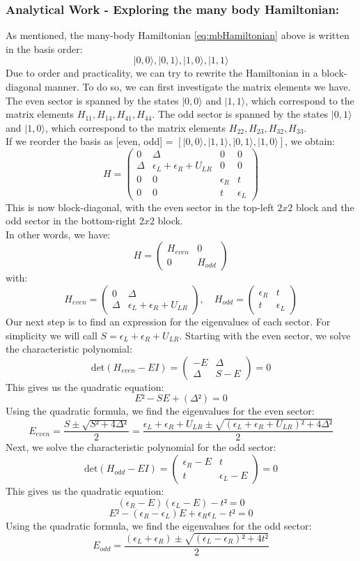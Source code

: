 \documentclass[11pt, letterpaper, titlepage]{article}
\begin{document}
\subsubsection{Analytical Work - Exploring the many body Hamiltonian:} 
As mentioned, the many-body Hamiltonian \ref{eq:mbHamiltonian} above is written in the basis order:
$$ |0,0⟩, |0,1⟩, |1,0⟩, |1,1⟩ $$
Due to order and practicality, we can try to rewrite the Hamiltonian in a block-diagonal manner. To do so, we can first investigate the matrix elements we have. The even sector is spanned by the states $|0,0⟩$ and $|1,1⟩$, which correspond to the matrix elements $H_{11}, H_{14}, H_{41}, H_{44}$. The odd sector is spanned by the states $|0,1⟩$ and $|1,0⟩$, which correspond to the matrix elements $H_{22}, H_{23}, H_{32}, H_{33}$.\\
If we reorder the basis as [even, odd] = $[|0,0⟩, |1,1⟩, |0,1⟩, |1,0⟩]$, we obtain:
$$
H = \begin{pmatrix}
0 & Δ & 0 & 0 \\
Δ & ϵ_L + ϵ_R + U_{LR} & 0 & 0 \\
0 & 0 & ϵ_R & t \\
0 & 0 & t & ϵ_L
\end{pmatrix}
$$
This is now block-diagonal, with the even sector in the top-left $2x2$ block and the odd sector in the bottom-right $2x2$ block.\\
In other words, we have:
$$
H = \begin{pmatrix}
H_{even} & 0 \\
0 & H_{odd}
\end{pmatrix}
$$
with:
$$
H_{even} = \begin{pmatrix}
0 & Δ \\
Δ & ϵ_L + ϵ_R + U_{LR}
\end{pmatrix}, \quad
H_{odd} = \begin{pmatrix}
ϵ_R & t \\
t & ϵ_L
\end{pmatrix}
$$
Our next step is to find an expression for the eigenvalues of each sector. For simplicity we will call $S = ϵ_L + ϵ_R + U_{LR}$. Starting with the even sector, we solve the characteristic polynomial:
$$
\text{det}(H_{even} - EI) = \begin{pmatrix}
    -E & Δ \\
    Δ & S - E
\end{pmatrix} =0
$$
This gives us the quadratic equation:
$$
E² - SE + (Δ²) = 0
$$
Using the quadratic formula, we find the eigenvalues for the even sector:
$$E_{even} = \frac{S ± \sqrt{S² + 4Δ²}}{2} = \frac{ϵ_L + ϵ_R + U_{LR} ± \sqrt{(ϵ_L + ϵ_R + U_{LR})² + 4Δ²}}{2}$$
Next, we solve the characteristic polynomial for the odd sector:
$$
\text{det}(H_{odd} - EI) = \begin{pmatrix}
    ϵ_R - E & t \\
    t & ϵ_L - E
\end{pmatrix} =0
$$
This gives us the quadratic equation:
$$(ϵ_R-E)(ϵ_L - E)  - t² = 0$$
$$E² -(ϵ_R-ϵ_L)E + ϵ_R ϵ_L - t² = 0$$
Using the quadratic formula, we find the eigenvalues for the odd sector:
$$E_{odd} = \frac{(ϵ_L + ϵ_R) ± \sqrt{(ϵ_L - ϵ_R)² + 4t²}}{2}$$
\end{document}
